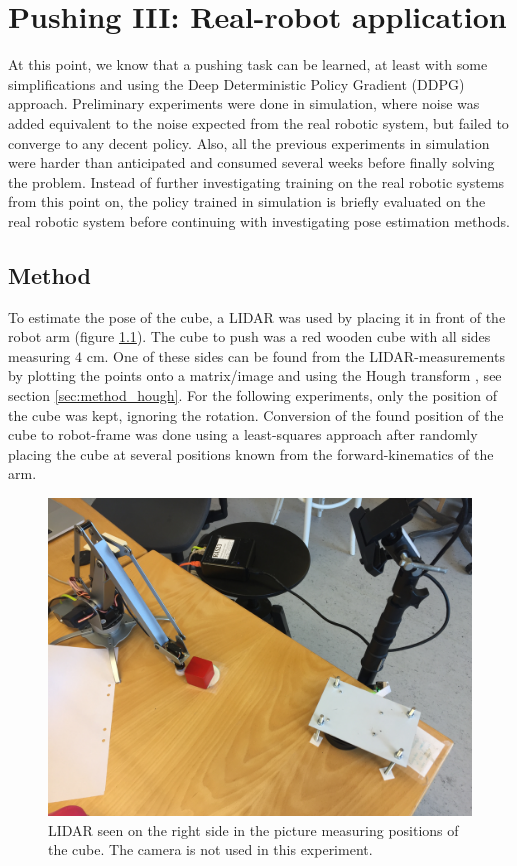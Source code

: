 \chapter{Pushing III: Real-robot application}

At this point, we know that a pushing task can be learned, at least with some
simplifications and using the Deep Deterministic Policy Gradient (DDPG)
approach. Preliminary experiments were done in simulation, where noise was
added equivalent to the noise expected from the real robotic system, but failed
to converge to any decent policy. Also, all the previous experiments in
simulation were harder than anticipated and consumed several weeks before
finally solving the problem. Instead of further investigating training on the
real robotic systems from this point on, the policy trained in simulation is
briefly evaluated on the real robotic system before continuing with
investigating pose estimation methods.

\section{Method}

To estimate the pose of the cube, a LIDAR was used by placing it in front of
the robot arm (figure \ref{fig:eef-frame}). The cube to push was a red wooden
cube with all sides measuring $4$ cm. One of these sides can be found from the
LIDAR-measurements by plotting the points onto a matrix/image and using the
Hough transform \cite{duda1972use}, see section \ref{sec:method_hough}. For the following experiments, only the
position of the cube was kept, ignoring the rotation. Conversion of the found
position of the cube to robot-frame was done using a least-squares approach
after randomly placing the cube at several positions known from the
forward-kinematics of the arm.

\begin{figure}[h!]
    \centering
    \includegraphics[width=0.48 \textwidth]{res/camera_placement_fixed.jpg}

    \caption{LIDAR seen on the right side in the picture measuring positions of
    the cube. The camera is not used in this experiment.}

    \label{fig:eef-frame}
    
\end{figure}

